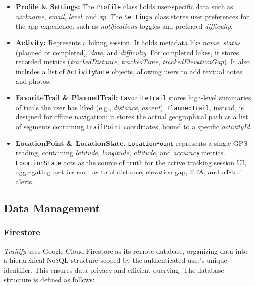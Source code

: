 \documentclass[12pt]{article}
\begin{document}
\begin{itemize}
    \item \textbf{Profile \& Settings:} The \texttt{Profile} class holds user-specific data such as \textit{nickname}, \textit{email}, \textit{level}, and \textit{xp}. The \texttt{Settings} class stores user preferences for the app experience, such as \textit{notifications} toggles and preferred \textit{difficulty}.
    
    \item \textbf{Activity:} Represents a hiking session. It holds metadata like \textit{name}, \textit{status} (planned or completed), \textit{date}, and \textit{difficulty}. For completed hikes, it stores recorded metrics (\textit{trackedDistance}, \textit{trackedTime}, \textit{trackedElevationGap}). It also includes a list of \texttt{ActivityNote} objects, allowing users to add textual notes and photos.
    
    \item \textbf{FavoriteTrail \& PlannedTrail:} \texttt{FavoriteTrail} stores high-level summaries of trails the user has liked (e.g., \textit{distance}, \textit{ascent}). \texttt{PlannedTrail}, instead, is designed for offline navigation; it stores the actual geographical path as a list of segments containing \texttt{TrailPoint} coordinates, bound to a specific \textit{activityId}.
    
    \item \textbf{LocationPoint \& LocationState:} \texttt{LocationPoint} represents a single GPS reading, containing \textit{latitude}, \textit{longitude}, \textit{altitude}, and \textit{accuracy} metrics. \texttt{LocationState} acts as the source of truth for the active tracking session UI, aggregating metrics such as total distance, elevation gap, ETA, and off-trail alerts.
\end{itemize}

\subsection{Data Management}

\subsubsection{Firestore}
\textit{Trailify} uses Google Cloud Firestore as its remote database, organizing data into a hierarchical NoSQL structure scoped by the authenticated user's unique identifier. This ensures data privacy and efficient querying. The database structure is defined as follows:
\end{document}
